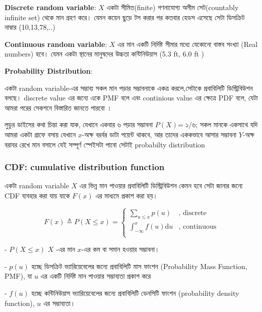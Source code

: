 \documentclass[graybox, envcountchap, twocolumn]{styles/svmult}
\begin{document}
{\bengalifont
\textbf{Discrete random variable}: $X$ একটা সীমিত(finite) গণনাযোগ্য অসীম সেট(countably infinite set) থেকে মান গ্রহণ করে। যেমন কয়েন ছুড়ে টস করার পর কতবার হেডস এসেছে সেটা ডিসক্রিট নাম্বার (10,13,78,..)


\textbf{Continuous random variable}:  $X$ এর মান একটি নির্দিষ্ট সীমার মধ্যে যেকোনো বাস্তব সংখ্যা (Real numbers) হবে। যেমন একটা স্থানের মানুষদের উচ্চতা কন্টিনিউয়াস (5.3 ft, 6.0 ft )}

\textbf{Probability Distribution}: {\bengalifont একটা random variable-এর সম্ভাব্য সকল মান পড়ার সম্ভাবনাকে একত্র করলে,সেটাকে প্রবাবিলিটি ডিস্ট্রিবিউশন বলছে। discrete value এর জন্যে একে PMF বলে এবং continious value এর ক্ষেত্রে PDF বলে, যেটা আমরা পরের সেকশনে বিস্তারিত জানতে পারবো ।

লুডুর ডাইসের কথা চিন্তা করা যাক, যেখানে একবার ৬ পড়ার সম্ভাবনা $P(X)$= ১/৬; সকল মানকে একসাথে যদি আমরা একটা গ্রাফে বসায় যেখানে $x$-অক্ষ বরর্বর ডাটা পয়েন্ট থাকবে, আর তাদের এককভাবে আসার সম্ভাবনা $Y$-অক্ষ বরাবর রেখে মান বসালে যেই সম্পূর্ণ স্পেইসটা পাবো সেটাই probabilty distribution }

\subsubsection{CDF: cumulative distribution function}
{\bengalifont একটা random variable} $X$ {\bengalifont এর ভিন্ন মান পাওয়ার প্রবাবিলিটি ডিস্ট্রিবিউশন কেমন হবে সেটা জানার জন্যে CDF ব্যবহার করা যায় যাকে} $𝐹(𝑥)$ {\bengalifont এর মাধ্যমে প্রকাশ করা হয়। }

\begin{equation}
F(x) \triangleq P(X \leq x)=\begin{cases}
\sum_{u \leq x}p(u) & \text{, discrete}\\
\int_{-\infty}^{x} f(u)\mathrm{d}u & \text{, continuous}\\
\end{cases}
\end{equation}


- $  P(X \leq x) $ $X$ -{\bengalifont এর মান} $x$-{\bengalifont এর কম বা সমান হওয়ার সম্ভাবনা।}

- $p(u)$ {\bengalifont হচ্ছে ডিসক্রিট ভ্যারিয়েবেলের জন্যে  প্রবাবিলিটি মাস ফাংশন (Probability Mass Function, PMF), যা $u$ এর একটি নির্দিষ্ট মান পাওয়ার সম্ভাব্যতা প্রকাশ করে }

- $ f(u)$ {\bengalifont হচ্ছে কন্টিনিউয়াস ভ্যারিয়েবেলের জন্যে প্রবাবিলিটি ডেনসিটি ফাংশন (probability density function), $u$ এর সম্ভাব্যতা। } 
\end{document}
